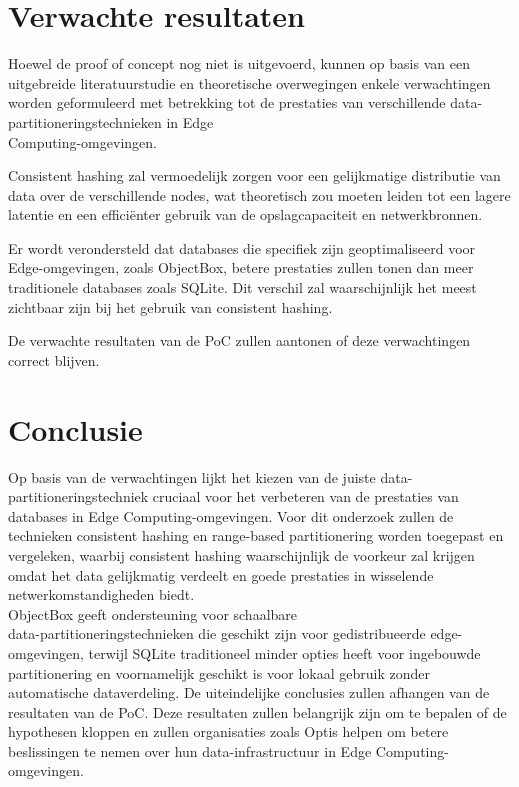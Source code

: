 
\section{Verwachte resultaten}%
\label{sec:verwachte_resultaten}

Hoewel de proof of concept nog niet is uitgevoerd, kunnen op basis van een uitgebreide literatuurstudie en theoretische overwegingen enkele verwachtingen worden geformuleerd met betrekking tot de prestaties van verschillende data-partitioneringstechnieken in Edge \\Computing-omgevingen.
 
Consistent hashing zal vermoedelijk zorgen voor een gelijkmatige distributie van data over de verschillende nodes, wat theoretisch zou moeten leiden tot een lagere latentie en een efficiënter gebruik van de opslagcapaciteit en netwerkbronnen.

Er wordt verondersteld dat databases die specifiek zijn geoptimaliseerd voor Edge-omgevingen, zoals ObjectBox, betere prestaties zullen tonen dan meer traditionele databases zoals SQLite.
 Dit verschil zal waarschijnlijk het meest zichtbaar zijn bij het gebruik van consistent hashing.

De verwachte resultaten van de PoC zullen aantonen of deze verwachtingen correct blijven.

\section{Conclusie}%
\label{sec:conclusie}
Op basis van de verwachtingen lijkt het kiezen van de juiste data-partitioneringstechniek cruciaal voor het verbeteren van de prestaties van databases in Edge Computing-omgevingen. 
Voor dit onderzoek zullen de technieken consistent hashing en range-based partitionering worden toegepast en vergeleken, waarbij consistent hashing waarschijnlijk de voorkeur zal krijgen omdat het data gelijkmatig verdeelt en goede prestaties in wisselende netwerkomstandigheden biedt.
\\ObjectBox geeft ondersteuning voor schaalbare \\data-partitioneringstechnieken die geschikt zijn voor gedistribueerde edge-omgevingen, terwijl SQLite traditioneel minder opties heeft voor ingebouwde partitionering en voornamelijk geschikt is voor lokaal gebruik zonder automatische dataverdeling.
De uiteindelijke conclusies zullen afhangen van de resultaten van de PoC.
 Deze resultaten zullen belangrijk zijn om te bepalen of de hypothesen kloppen en zullen organisaties zoals Optis helpen om betere beslissingen te nemen over hun data-infrastructuur in Edge Computing-omgevingen.

